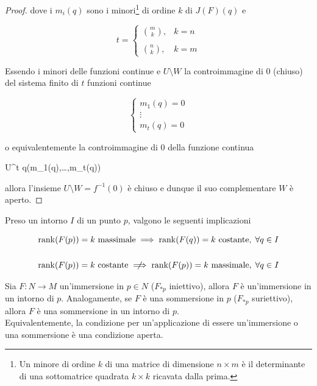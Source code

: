 \begin{proof}
	dove i $ m_{i}(q) $ sono i minori\footnote{%
		Un minore di ordine $ k $ di una matrice di dimensione $ n \times m $ è il determinante di una sottomatrice quadrata $ k \times k $ ricavata dalla prima.%
	} di ordine $ k $ di $ J(F)(q) $ e
	
	\begin{equation}
		t = %
		\begin{cases}
			\displaystyle \binom{m}{k}, & k = n \\ \\
			\displaystyle \binom{n}{k}, & k = m
		\end{cases}
	\end{equation}

	Essendo i minori delle funzioni continue e $ U \setminus W $ la controimmagine di 0 (chiuso) del sistema finito di $ t $ funzioni continue
	
	\begin{equation}
		\begin{cases}
			m_{1}(q) = 0 \\
			\vdots \\
			m_{t}(q) = 0
		\end{cases}
	\end{equation}

	o equivalentemente la controimmagine di 0 della funzione continua
	
		{U}{\R^{t}}
		{q}{(m_{1}(q),\dots,m_{t}(q))}

	allora l'insieme $ U \setminus W = f^{-1}(0) $ è chiuso e dunque il suo complementare $ W $ è aperto.
\end{proof}

\begin{remark}
	Preso un intorno $ I $ di un punto $ p $, valgono le seguenti implicazioni
	
	\begin{gather}
		\rank(F(p)) = k \text{ massimale} \implies \rank(F(q)) = k \text{ costante}, \; \forall q \in I \\
		\nonumber \\
		\rank(F(p)) = k \text{ costante} \notimplies \rank(F(p)) = k \text{ massimale}, \; \forall q \in I
	\end{gather}
\end{remark}

\begin{corollary}
	Sia $ F : N \to M $ un'immersione in $ p \in N $ ($ F_{*p} $ iniettivo), allora $ F $ è un'immersione in un intorno di $ p $. Analogamente, se $ F $ è una sommersione in $ p $ ($ F_{*p} $ suriettivo), allora $ F $ è una sommersione in un intorno di $ p $. \\
	Equivalentemente, la condizione per un'applicazione di essere un'immersione o una sommersione è una condizione aperta.
\end{corollary}

